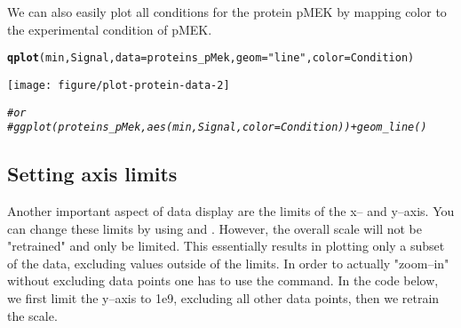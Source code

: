 \documentclass{article}\usepackage[]{graphicx}\usepackage[usenames,dvipsnames]{color}
\makeatletter
\def\maxwidth{ %
  \ifdim\Gin@nat@width>\linewidth
    \linewidth
  \else
    \Gin@nat@width
  \fi
}
\newcommand{\hlstr}[1]{\textcolor[rgb]{0.192,0.494,0.8}{#1}}%
\newcommand{\hlcom}[1]{\textcolor[rgb]{0.678,0.584,0.686}{\textit{#1}}}%
\newcommand{\hlstd}[1]{\textcolor[rgb]{0.345,0.345,0.345}{#1}}%
\newcommand{\hlkwc}[1]{\textcolor[rgb]{0.333,0.667,0.333}{#1}}%
\newcommand{\hlkwd}[1]{\textcolor[rgb]{0.737,0.353,0.396}{\textbf{#1}}}%
\newenvironment{kframe}{%
 \def\at@end@of@kframe{}%
 \ifinner\ifhmode%
  \def\at@end@of@kframe{\end{minipage}}%
  \begin{minipage}{\columnwidth}%
 \fi\fi%
 \def\FrameCommand##1{\hskip\@totalleftmargin \hskip-\fboxsep
 \colorbox{shadecolor}{##1}\hskip-\fboxsep
     \hskip-\linewidth \hskip-\@totalleftmargin \hskip\columnwidth}%
 \MakeFramed {\advance\hsize-\width
   \@totalleftmargin\z@ \linewidth\hsize
   \@setminipage}}%
 {\par\unskip\endMakeFramed%
 \at@end@of@kframe}
\newenvironment{knitrout}{}{} %
\makeatother
\begin{document}
We can also easily plot all conditions for the protein pMEK by
mapping color to the experimental condition of pMEK.


\begin{knitrout}
\color{fgcolor}\begin{kframe}
\begin{alltt}
\hlkwd{qplot}\hlstd{(min, Signal,} \hlkwc{data} \hlstd{= proteins_pMek,} \hlkwc{geom} \hlstd{=} \hlstr{"line"}\hlstd{,} \hlkwc{color} \hlstd{= Condition)}
\end{alltt}
\end{kframe}
\texttt{[image: figure/plot-protein-data-2]} 
\begin{kframe}\begin{alltt}
\hlcom{# or}
\hlcom{#ggplot(proteins_pMek, aes(min, Signal, color = Condition) ) + geom_line()}
\end{alltt}
\end{kframe}
\end{knitrout}

\subsection{Setting axis limits}
Another important aspect of data display are the limits of the 
x-- and y--axis. You can change these limits by using 
and . However, the overall scale will not be "retrained"
and only be limited. This essentially results in plotting only a subset
of the data, excluding values outside of the 
limits. In order to actually "zoom--in" without excluding data points
one has to use the   command. In the
code below, we first limit the y--axis to 1e9, excluding all
other data points, then we retrain the scale.
\end{document}
